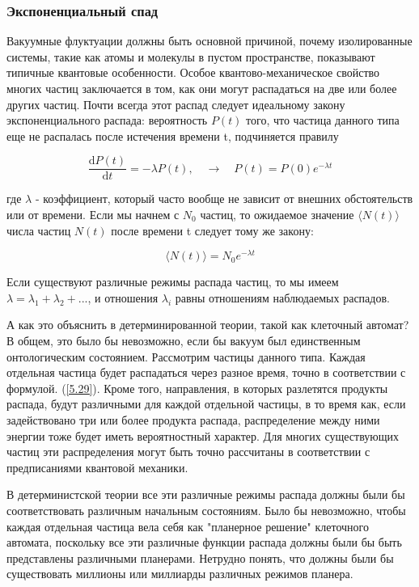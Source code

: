 \documentclass[main.tex]{subfiles}
\begin{document}
\subsubsection{Экспоненциальный спад}\label{ch5.7.7}

Вакуумные флуктуации должны быть основной причиной, почему изолированные системы, такие как атомы и молекулы в пустом пространстве, показывают типичные квантовые особенности. Особое квантово-механическое свойство многих частиц заключается в том, как они могут распадаться на две или более других частиц. Почти всегда этот распад следует идеальному закону экспоненциального распада: вероятность $P(t)$ того, что частица данного типа еще не распалась после истечения времени t, подчиняется правилу

\begin{equation}\label{5.29}
	\frac{\mathrm{d} P(t)}{\mathrm{d} t}=-\lambda P(t), \quad \rightarrow \quad P(t)=P(0) e^{-\lambda t}
\end{equation}
                        
где $\lambda$ - коэффициент, который часто вообще не зависит от внешних обстоятельств или от времени. Если мы начнем с $N_0$ частиц, то ожидаемое значение $\langle N(t) \rangle$ числа частиц $N (t)$ после времени t следует тому же закону:


\begin{equation}\label{5.30}
	\langle N(t) \rangle = N_0 e^{-\lambda t}
\end{equation}

             
Если существуют различные режимы распада частиц, то мы имеем $\lambda = \lambda_1 + \lambda_2 + ...$, и отношения $\lambda_i$ равны отношениям наблюдаемых распадов.

А как это объяснить в детерминированной теории, такой как клеточный автомат? В общем, это было бы невозможно, если бы вакуум был единственным онтологическим состоянием. Рассмотрим частицы данного типа. Каждая отдельная частица будет распадаться через разное время, точно в соответствии с формулой. (\ref{5.29}). Кроме того, направления, в которых разлетятся продукты распада, будут различными для каждой отдельной частицы, в то время как, если задействовано три или более продукта распада, распределение между ними энергии тоже будет иметь вероятностный характер. Для многих существующих частиц эти распределения могут быть точно рассчитаны в соответствии с предписаниями квантовой механики.

В детерминистской теории все эти различные режимы распада должны были бы соответствовать различным начальным состояниям. Было бы невозможно, чтобы каждая отдельная частица вела себя как "планерное решение" клеточного автомата, поскольку все эти различные функции распада должны были бы быть представлены различными планерами. Нетрудно понять, что должны были бы существовать миллионы или миллиарды различных режимов планера.
\end{document}
